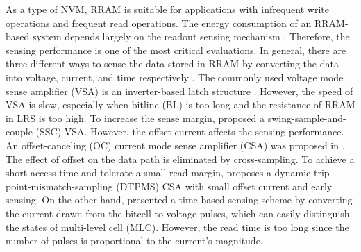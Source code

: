 As a type of NVM, RRAM is suitable for applications with infrequent write operations and frequent read operations.
The energy consumption of an RRAM-based system depends largely on the readout sensing mechanism \cite{wan2020voltage}.
Therefore, the sensing performance is one of the most critical evaluations.
In general, there are three different ways to sense the data stored in RRAM by converting the data into voltage, current, and time respectively \cite{8906921}. 
The commonly used voltage mode sense amplifier (VSA) is an inverter-based latch structure \cite{yang20132mb}. However, the speed of VSA is slow, especially when bitline (BL) is too long and the resistance of RRAM in LRS is too high.
To increase the sense margin, \cite{chang201419} proposed a swing-sample-and-couple (SSC) VSA. However, the offset current affects the sensing performance. An offset-canceling (OC) current mode sense amplifier (CSA) was proposed in \cite{jain201913}. The effect of offset on the data path is eliminated by cross-sampling.
To achieve a short access time and tolerate a small read margin, \cite{lo2018reram} proposes a dynamic-trip-point-mismatch-sampling (DTPMS) CSA with small offset current and early sensing. 
On the other hand, \cite{8906921} presented a time-based sensing scheme by converting the current drawn from the bitcell to voltage pulses, which can easily distinguish the states of multi-level cell (MLC). However, the read time is too long since the number of pulses is proportional to the current’s magnitude.

